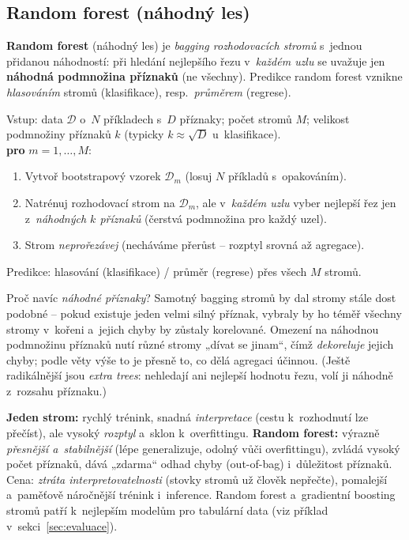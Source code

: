 \subsection{Random forest (náhodný les)}

\begin{definice}
\textbf{Random forest} (náhodný les) je \emph{bagging rozhodovacích stromů} s~jednou přidanou náhodností: při hledání nejlepšího řezu v~\emph{každém uzlu} se uvažuje jen \textbf{náhodná podmnožina příznaků} (ne všechny). Predikce random forest vznikne \emph{hlasováním} stromů (klasifikace), resp.\ \emph{průměrem} (regrese).
\end{definice}

\begin{algo}
Vstup: data $\mathcal{D}$ o~$N$ příkladech s~$D$ příznaky; počet stromů $M$; velikost podmnožiny příznaků $k$ (typicky $k\approx\sqrt{D}$ u~klasifikace).\\[2pt]
\textbf{pro} $m=1,\dots,M$:
\begin{enumerate}[leftmargin=2.4em,itemsep=1pt]
  \item Vytvoř bootstrapový vzorek $\mathcal{D}_m$ (losuj $N$ příkladů s~opakováním). 
  \item Natrénuj rozhodovací strom na $\mathcal{D}_m$, ale v~\emph{každém uzlu} vyber nejlepší řez jen z~\emph{náhodných $k$ příznaků} (čerstvá podmnožina pro každý uzel). 
  \item Strom \emph{neprořezávej} (necháváme přerůst -- rozptyl srovná až agregace).
\end{enumerate}
Predikce: \;hlasování (klasifikace) / průměr (regrese) přes všech $M$ stromů.
\end{algo}

\begin{intuice}
Proč navíc \emph{náhodné příznaky}? Samotný bagging stromů by dal stromy stále dost podobné -- pokud existuje jeden velmi silný příznak, vybraly by ho téměř všechny stromy v~kořeni a~jejich chyby by zůstaly korelované. Omezení na náhodnou podmnožinu příznaků nutí různé stromy „dívat se jinam``, čímž \emph{dekoreluje} jejich chyby; podle věty výše to je přesně to, co dělá agregaci účinnou. (Ještě radikálnější jsou \emph{extra trees}: nehledají ani nejlepší hodnotu řezu, volí ji náhodně z~rozsahu příznaku.)
\end{intuice}

\begin{poznamka}
\textbf{Jeden strom:} rychlý trénink, snadná \emph{interpretace} (cestu k~rozhodnutí lze přečíst), ale vysoký \emph{rozptyl} a~sklon k~overfittingu. \textbf{Random forest:} výrazně \emph{přesnější a~stabilnější} (lépe generalizuje, odolný vůči overfittingu), zvládá vysoký počet příznaků, dává „zdarma`` odhad chyby (out-of-bag) i~důležitost příznaků. Cena: \emph{ztráta interpretovatelnosti} (stovky stromů už člověk nepřečte), pomalejší a~paměťově náročnější trénink i~inference. Random forest a~gradientní boosting stromů patří k~nejlepším modelům pro tabulární data (viz příklad v~sekci~\ref{sec:evaluace}).
\end{poznamka}

